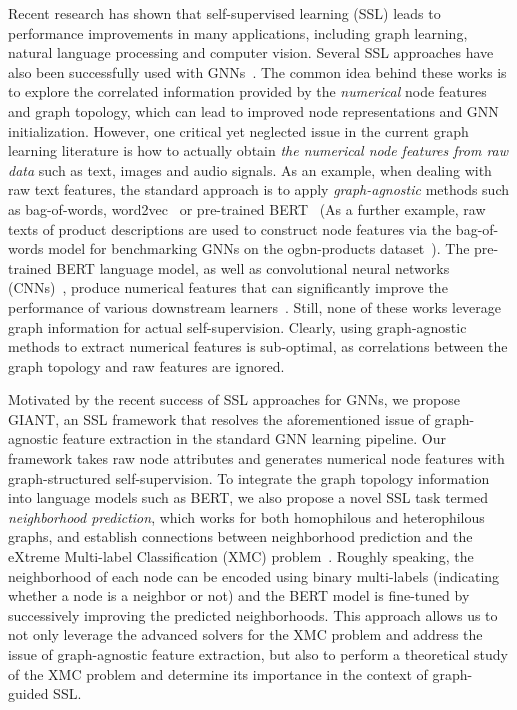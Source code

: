 \documentclass{article} \usepackage{iclr2022_conference,times}
\begin{document}
Recent research has shown that self-supervised learning (SSL) leads to performance improvements in many applications, including graph learning, natural language processing and computer vision. Several SSL approaches have also been successfully used with GNNs~\citep{Hu*2020Strategies,you2018graphrnn,you2020graph,hu2020gpt,velickovic2019deep,kipf2016variational,deng2020graphzoom}. The common idea behind these works is to explore the correlated information provided by the \emph{numerical} node features and graph topology, which can lead to improved node representations and GNN initialization. However, one critical yet neglected issue in the current graph learning literature is how to actually obtain \emph{the numerical node features from raw data} such as text, images and audio signals. As an example, when dealing with raw text features, the standard approach is to apply \emph{graph-agnostic} methods such as bag-of-words, word2vec~\citep{mikolov2013distributed} or pre-trained BERT~\citep{devlin2018bert} (As a further example, raw texts of product descriptions are used to construct node features via the bag-of-words model for benchmarking GNNs on the ogbn-products dataset~\citep{hu2020open,chiang2019cluster}). The pre-trained BERT language model, as well as convolutional neural networks (CNNs)~\citep{goyal2019scaling,kolesnikov2019revisiting}, produce numerical features that can significantly improve the performance of various downstream learners~\citep{devlin2018bert}. Still, none of these works leverage graph information for actual self-supervision. Clearly, using graph-agnostic methods to extract numerical features is sub-optimal, as correlations between the graph topology and raw features are ignored. 

Motivated by the recent success of SSL approaches for GNNs, we propose GIANT, an SSL framework that resolves the aforementioned issue of graph-agnostic feature extraction in the standard GNN learning pipeline. Our framework takes raw node attributes and generates numerical node features with graph-structured self-supervision. To integrate the graph topology information into language models such as BERT, we also propose a novel SSL task termed \emph{neighborhood prediction}, which works for both homophilous and heterophilous graphs, and establish connections between neighborhood prediction and the eXtreme Multi-label Classification (XMC) problem~\citep{shen2020extreme,yu2020pecos,chang2020taming}. Roughly speaking, the neighborhood of each node can be encoded using binary multi-labels (indicating whether a node is a neighbor or not) and the BERT model is fine-tuned by successively improving the predicted neighborhoods. This approach allows us to not only leverage the advanced solvers for the XMC problem and address the issue of graph-agnostic feature extraction, but also to perform a theoretical study of the XMC problem and determine its importance in the context of graph-guided SSL.  
\end{document}

